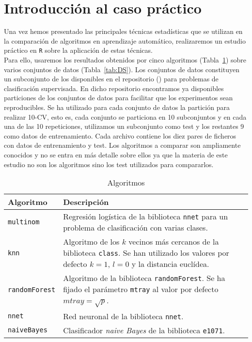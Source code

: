 \section{Introducción al caso práctico}
	Una vez hemos presentado las principales técnicas
estadísticas que se utilizan en la comparación de algoritmos
en aprendizaje automático, realizaremos un estudio práctico
en \texttt{R} sobre la aplicación de estas técnicas.\\
	Para ello, usaremos los resultados obtenidos por cinco
algoritmos (Tabla~\ref{tab:algoritmos}) 
sobre varios conjuntos de datos (Tabla~\ref{tab:DS}). Los
conjuntos de datos constituyen un subconjunto de los 
disponibles en el repositorio 
(\cite{alcala2010keel}) para problemas de clasificación
supervisada. En dicho repositorio encontramos ya disponibles
particiones de los conjuntos de datos para facilitar que los
experimentos sean reproducibles. Se ha utilizado para cada 
conjunto de datos la partición para realizar 10-CV, esto es,
cada conjunto se particiona en 10 subconjuntos y en cada una 
de las 10 repeticiones, utilizamos un subconjunto como test y
los restantes 9 como datos de entrenamiento. Cada archivo
contiene los diez pares de ficheros con datos de
entrenamiento y test. Los algoritmos a comparar son
ampliamente conocidos y no se entra en más detalle sobre
ellos ya que la materia de este estudio no son los algoritmos
sino los test utilizados para compararlos.

\begin{table}[]
\centering
\caption{Algoritmos}
\label{tab:algoritmos}
\begin{tabularx}{\textwidth}{lX}
\toprule
Algoritmo             & Descripción                                                                                                                             \\ \midrule
\texttt{multinom}     & Regresión logística de la biblioteca \texttt{nnet} para un problema de clasificación con varias clases.                               \\
\texttt{knn}          & Algoritmo de los $k$ vecinos más cercanos de la biblioteca \texttt{class}. 
Se han utilizado los valores por defecto $k=1$, $l=0$ y la distancia euclídea.      \\
\texttt{randomForest} & Algoritmo de la biblioteca \texttt{randomForest}. Se ha fijado el parámetro \texttt{mtray} al valor por defecto $mtray = \sqrt{p}$. \\
\texttt{nnet}         & Red neuronal de la biblioteca \texttt{nnet}.                                                                                          \\
\texttt{naiveBayes}   & Clasificador \textit{naive Bayes} de la biblioteca \texttt{e1071}.                                                                  \\ \bottomrule
\end{tabularx}
\end{table}

